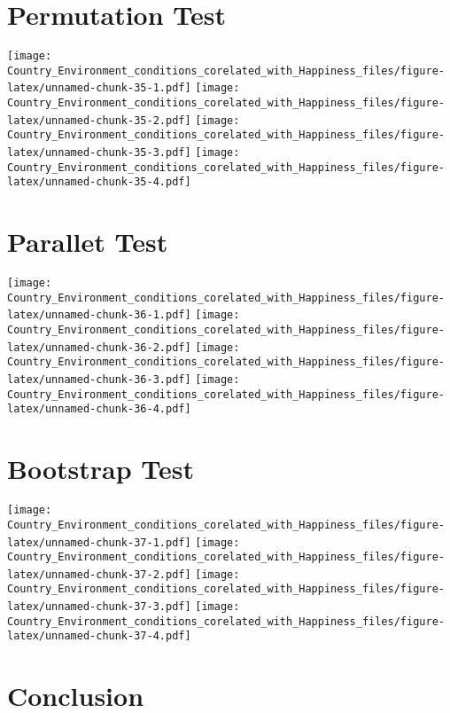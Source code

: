 \documentclass[]{book}
\begin{document}
\hypertarget{permutation-test-1}{%
\section{Permutation Test}\label{permutation-test-1}}

\texttt{[image: Country\_Environment\_conditions\_corelated\_with\_Happiness\_files/figure-latex/unnamed-chunk-35-1.pdf]}
\texttt{[image: Country\_Environment\_conditions\_corelated\_with\_Happiness\_files/figure-latex/unnamed-chunk-35-2.pdf]}
\texttt{[image: Country\_Environment\_conditions\_corelated\_with\_Happiness\_files/figure-latex/unnamed-chunk-35-3.pdf]}
\texttt{[image: Country\_Environment\_conditions\_corelated\_with\_Happiness\_files/figure-latex/unnamed-chunk-35-4.pdf]}

\hypertarget{parallet-test-1}{%
\section{Parallet Test}\label{parallet-test-1}}

\texttt{[image: Country\_Environment\_conditions\_corelated\_with\_Happiness\_files/figure-latex/unnamed-chunk-36-1.pdf]}
\texttt{[image: Country\_Environment\_conditions\_corelated\_with\_Happiness\_files/figure-latex/unnamed-chunk-36-2.pdf]}
\texttt{[image: Country\_Environment\_conditions\_corelated\_with\_Happiness\_files/figure-latex/unnamed-chunk-36-3.pdf]}
\texttt{[image: Country\_Environment\_conditions\_corelated\_with\_Happiness\_files/figure-latex/unnamed-chunk-36-4.pdf]}

\hypertarget{bootstrap-test-1}{%
\section{Bootstrap Test}\label{bootstrap-test-1}}

\texttt{[image: Country\_Environment\_conditions\_corelated\_with\_Happiness\_files/figure-latex/unnamed-chunk-37-1.pdf]}
\texttt{[image: Country\_Environment\_conditions\_corelated\_with\_Happiness\_files/figure-latex/unnamed-chunk-37-2.pdf]}
\texttt{[image: Country\_Environment\_conditions\_corelated\_with\_Happiness\_files/figure-latex/unnamed-chunk-37-3.pdf]}
\texttt{[image: Country\_Environment\_conditions\_corelated\_with\_Happiness\_files/figure-latex/unnamed-chunk-37-4.pdf]}

\hypertarget{conclusion-1}{%
\section{Conclusion}\label{conclusion-1}}
\end{document}
